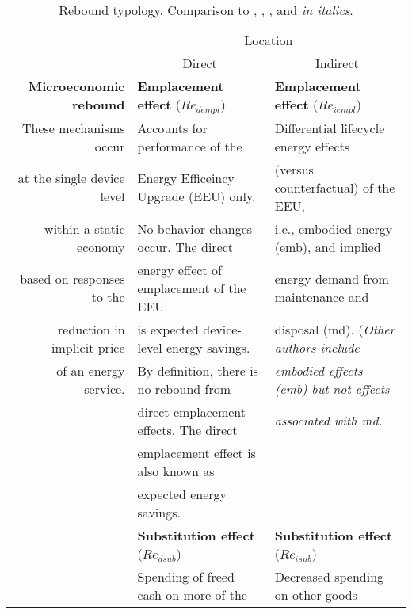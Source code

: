 \begin{table}
\footnotesize
\begin{center}
\caption{Rebound typology. Comparison to \citet{Sorrell:2009cg}, \citet{Jenkins2011}, 
                           \citet{Thomas:2013aa,Thomas:2013ab}, and \citet{Walnum2014} \emph{in italics}.}
\label{tab:rebound_typology}
\begin{tabular}{ r l l }
\toprule
                                   & \multicolumn{2}{c}{Location} \\ 
                                   & \multicolumn{1}{c}{Direct}                  & \multicolumn{1}{c}{Indirect} \\
                                   \cmidrule{2-3}
\textbf{Microeconomic rebound}     & \textbf{Emplacement effect} ($Re_{dempl}$)  & \textbf{Emplacement effect} ($Re_{iempl}$) \\
These mechanisms occur             & Accounts for performance of the             & Differential lifecycle energy effects \\
at the single device level         & Energy Efficeincy Upgrade (EEU) only.       & (versus counterfactual) of the EEU, \\
within a static economy            & No behavior changes occur. The direct       & i.e., embodied energy (emb), and implied \\
based on responses to the          & energy effect of emplacement of the EEU     & energy demand from maintenance and \\
reduction in implicit price        & is expected device-level energy savings.    & disposal (md). (\emph{Other authors include} \\
of an energy service.              & By definition, there is no rebound from     & \emph{embodied effects (emb) but not effects} \\
                                   & direct emplacement effects. The direct      & \emph{associated with md.} \\
                                   & emplacement effect is also known as         & \\
                                   & expected energy savings.                    & \\
                                   \cmidrule{2-3}
                                   & \textbf{Substitution effect} ($Re_{dsub}$)  & \textbf{Substitution effect} ($Re_{isub}$) \\
                                   & Spending of freed cash on more of the       & Decreased spending on other goods  \\

\end{tabular}
\end{center}
\end{table}
